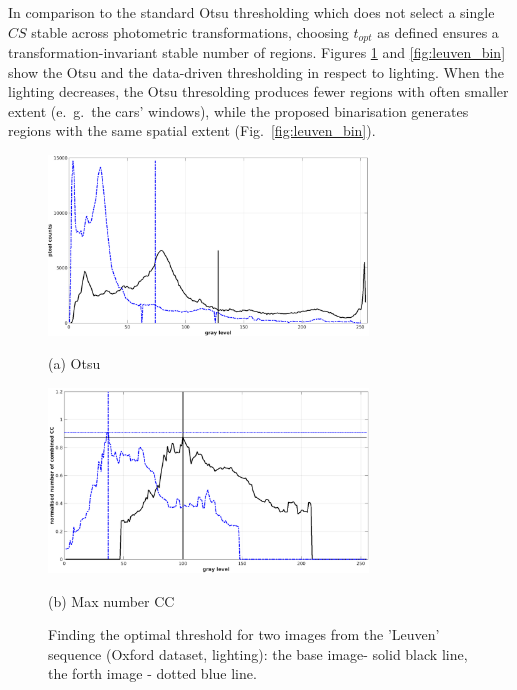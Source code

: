 \documentclass[conference,compsoc]{IEEEtran}
\begin{document}
In comparison to the standard Otsu thresholding which does not select a single $CS$ stable across photometric transformations, choosing $t_{opt}$ as defined ensures a transformation-invariant stable number of regions. Figures \ref{fig:binary_hist} and \ref{fig:leuven_bin} show the Otsu and the data-driven thresholding in respect to lighting. When the lighting decreases, the Otsu thresolding produces fewer regions with often smaller extent (e.~g.~the cars' windows), while the proposed binarisation generates regions with the same spatial extent (Fig.~\ref{fig:leuven_bin}). 
\begin{figure}[htb]

\begin{minipage}[b]{0.99\linewidth}
  \centering
  \centerline{\includegraphics[width=8.5cm]{hist_otsu_leuven_1_4}}
  \centerline{(a) Otsu}\medskip
\end{minipage}
\hfill
\begin{minipage}[b]{0.99\linewidth}
  \centering
  \centerline{\includegraphics[width=8.5cm]{hist_numcc_leuven_1_4}}
\centerline{(b) Max number CC}\medskip
\end{minipage}
\hfill
\caption{Finding the optimal threshold for two images from the 'Leuven' sequence 
(Oxford dataset, lighting): the base image- solid black line, the forth image - dotted blue line.}
\label{fig:binary_hist}
%
\end{figure}
\end{document}
